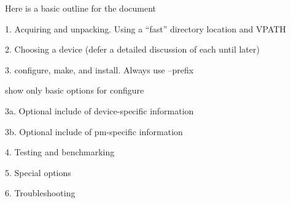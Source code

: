 \documentclass[dvipdfm,11pt]{article}
\begin{document}
Here is a basic outline for the document

1. Acquiring and unpacking.  Using a ``fast'' directory location and VPATH

2. Choosing a device (defer a detailed discussion of each until later)

3. configure, make, and install.  Always use --prefix 

show only basic options for configure

   3a. Optional include of device-specific information

   3b. Optional include of pm-specific information

4. Testing and benchmarking

5. Special options

6. Troubleshooting
\end{document}
